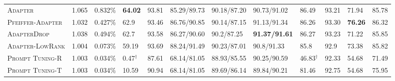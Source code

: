 \documentclass{article}
\newcommand{\adapter}{\textsc{Adapter}\xspace}
\newcommand{\adapterlowrank}{\textsc{Adapter-LowRank}\xspace}
\newcommand{\adapternoclf}{\textsc{Adapter}\xspace}
\newcommand{\intrinsic}{\textsc{Intrinsic-SAID}\xspace}
\newcommand{\prompttuningrandom}{\textsc{Prompt Tuning-R}\xspace}
\newcommand{\prompttuningtokens}{\textsc{Prompt Tuning-T}\xspace}
\newcommand{\pfeifferadapter}{\textsc{Pfeiffer-Adapter}\xspace}
\newcommand{\pfeifferadapternoclf}{\textsc{Pfeiffer-Adapter}\xspace}
\newcommand{\adapterdrop}{\textsc{AdapterDrop}\xspace}
\newcommand{\adapterdropnoclf}{\textsc{AdapterDrop}\xspace}
\begin{document}
\begin{table}[tp]
\begin{adjustbox}{max width=\textwidth}
\begin{tabular}{l@{\hskip 0.05in}|l@{\hskip 0.05in}l@{\hskip 0.01in}|l@{\hskip 0.1in}l@{\hskip 0.1in}l@{\hskip 0.1in}l@{\hskip 0.1in}l@{\hskip 0.1in}l@{\hskip 0.1in}l@{\hskip 0.1in}l|l}
\adapternoclf  & 1.065 & 0.832\% & \textbf{64.02} &  93.81 &  85.29/89.73 &  90.18/87.20 &  90.73/91.02 &  86.49 &  93.21 &  71.94 &  85.78 \\ %
\pfeifferadapternoclf &1.032 &0.427\%& 62.9 &  93.46 &  86.76/90.85 &  90.14/87.15 &  91.13/91.34 &  86.26 &  93.30 &  \textbf{76.26} &  86.32 \\ %
\adapterdropnoclf &1.038&0.494\% & 62.7 &  93.58 &  86.27/90.60 &  90.2/87.25 &  \textbf{91.37/91.61} &  86.27 &  93.23 &  71.22 &  85.85 \\ %
\adapterlowrank &  1.004 & 0.073\% &  59.19 &  93.69 &  88.24/91.49 &  90.23/87.01 &  90.8/91.33 &  85.8 &  92.9 &  73.38 &  85.82\\ 
\midrule 
\prompttuningrandom &1.003 & 0.034\%&  0.47$^\dagger$ &  87.61 &  68.14/81.05 &  88.93/85.55 &  90.25/90.59 &  46.83$^\dagger$ &  92.33 &  54.68 & 71.49  \\ %
\prompttuningtokens &1.003 & 0.034\%& 10.59 &  90.94 &  68.14/81.05 &  89.69/86.14 &  89.84/90.21 &  81.46 &  92.75 &  54.68 &  75.95  \\ %
\midrule 

\end{tabular}
\end{adjustbox}
\end{table}
\end{document}
